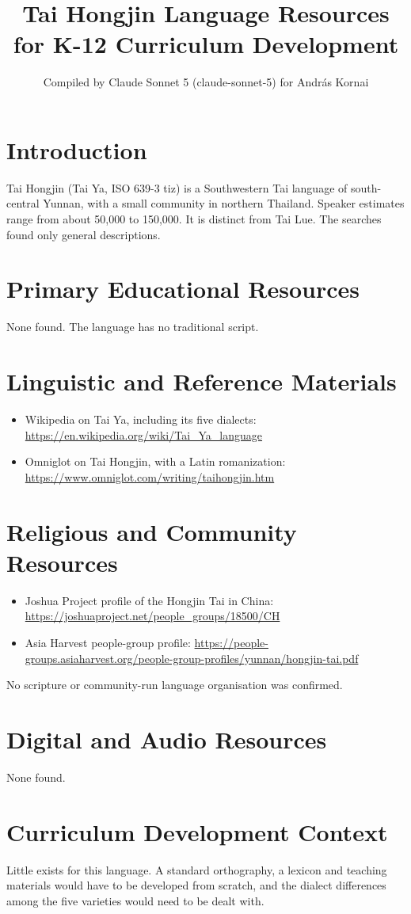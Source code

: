\documentclass[12pt]{article}
\title{Tai Hongjin Language Resources for K-12 Curriculum Development}
\author{Compiled by Claude Sonnet 5 (claude-sonnet-5) for Andr\'as Kornai}
\date{}
\begin{document}
\maketitle
\section{Introduction}
Tai Hongjin (Tai Ya, ISO 639-3 tiz) is a Southwestern Tai language of south-central Yunnan, with a small community in northern Thailand. Speaker estimates range from about 50,000 to 150,000. It is distinct from Tai Lue. The searches found only general descriptions.

\section{Primary Educational Resources}
None found. The language has no traditional script.

\section{Linguistic and Reference Materials}
\begin{itemize}
\item Wikipedia on Tai Ya, including its five dialects: \url{https://en.wikipedia.org/wiki/Tai_Ya_language}
\item Omniglot on Tai Hongjin, with a Latin romanization: \url{https://www.omniglot.com/writing/taihongjin.htm}
\end{itemize}

\section{Religious and Community Resources}
\begin{itemize}
\item Joshua Project profile of the Hongjin Tai in China: \url{https://joshuaproject.net/people_groups/18500/CH}
\item Asia Harvest people-group profile: \url{https://people-groups.asiaharvest.org/people-group-profiles/yunnan/hongjin-tai.pdf}
\end{itemize}
No scripture or community-run language organisation was confirmed.

\section{Digital and Audio Resources}
None found.

\section{Curriculum Development Context}
Little exists for this language. A standard orthography, a lexicon and teaching materials would have to be developed from scratch, and the dialect differences among the five varieties would need to be dealt with.
\end{document}
